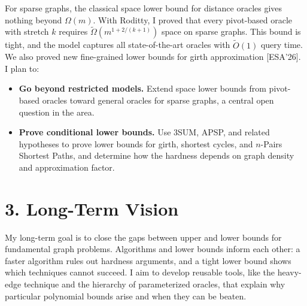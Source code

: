 \documentclass[11pt,a4paper]{article}
\begin{document}
For sparse graphs, the classical space lower bound for distance oracles gives nothing beyond $\Omega(m)$. With Roditty, I proved that every pivot-based oracle with stretch $k$ requires $\tilde\Omega(m^{1+2/(k+1)})$ space on sparse graphs. This bound is tight, and the model captures all state-of-the-art oracles with $\tilde O(1)$ query time. We also proved new fine-grained lower bounds for girth approximation [ESA'26]. I plan to:
\begin{itemize}
  \item \textbf{Go beyond restricted models.} Extend space lower bounds from pivot-based oracles toward general oracles for sparse graphs, a central open question in the area.
  \item \textbf{Prove conditional lower bounds.} Use 3SUM, APSP, and related hypotheses to prove lower bounds for girth, shortest cycles, and $n$-Pairs Shortest Paths, and determine how the hardness depends on graph density and approximation factor.
\end{itemize}

\section{3. Long-Term Vision}

My long-term goal is to close the gaps between upper and lower bounds for fundamental graph problems. Algorithms and lower bounds inform each other: a faster algorithm rules out hardness arguments, and a tight lower bound shows which techniques cannot succeed. I aim to develop reusable tools, like the heavy-edge technique and the hierarchy of parameterized oracles, that explain why particular polynomial bounds arise and when they can be beaten.
\end{document}
